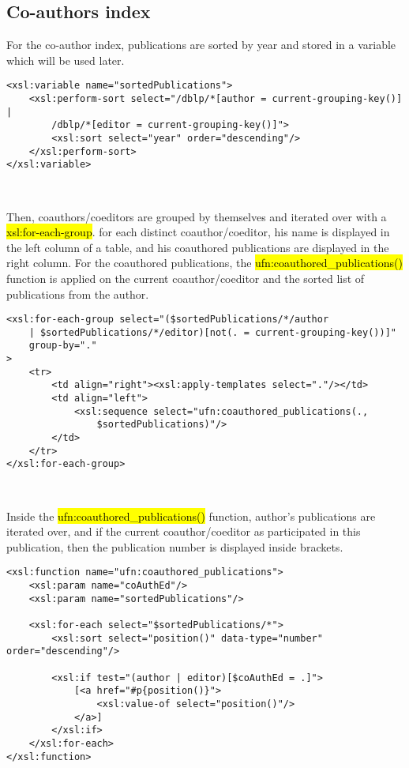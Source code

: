 \subsection{Co-authors index}
For the co-author index, publications are sorted by year and stored in a
variable which will be used later.\\

\begin{lstlisting}
<xsl:variable name="sortedPublications">
    <xsl:perform-sort select="/dblp/*[author = current-grouping-key()] |
        /dblp/*[editor = current-grouping-key()]">
        <xsl:sort select="year" order="descending"/>
    </xsl:perform-sort>
</xsl:variable>
\end{lstlisting}
\

Then, coauthors/coeditors are grouped by themselves and iterated over with a
\hl{xsl:for-each-group}. for each distinct coauthor/coeditor, his name is
displayed in the left column of a table, and his coauthored publications
are displayed in the right column. For the coauthored publications, the
\hl{ufn:coauthored\_publications()} function is applied on the current
coauthor/coeditor and the sorted list of publications from the author.\\

\begin{lstlisting}
<xsl:for-each-group select="($sortedPublications/*/author
    | $sortedPublications/*/editor)[not(. = current-grouping-key())]"
    group-by="."
>
    <tr>
        <td align="right"><xsl:apply-templates select="."/></td>
        <td align="left">
            <xsl:sequence select="ufn:coauthored_publications(.,
                $sortedPublications)"/>
        </td>
    </tr>
</xsl:for-each-group>
\end{lstlisting}
\

Inside the \hl{ufn:coauthored\_publications()} function, author's publications
are iterated over, and if the current coauthor/coeditor as participated in this
publication, then the publication number is displayed inside brackets.\\

\begin{lstlisting}
<xsl:function name="ufn:coauthored_publications">
    <xsl:param name="coAuthEd"/>
    <xsl:param name="sortedPublications"/>

    <xsl:for-each select="$sortedPublications/*">
        <xsl:sort select="position()" data-type="number" order="descending"/>

        <xsl:if test="(author | editor)[$coAuthEd = .]">
            [<a href="#p{position()}">
                <xsl:value-of select="position()"/>
            </a>]
        </xsl:if>
    </xsl:for-each>
</xsl:function>
\end{lstlisting}
\newpage
